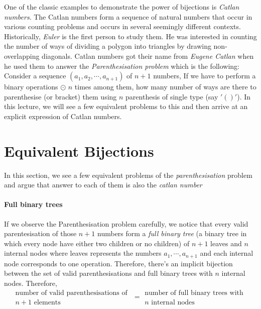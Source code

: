 
One of the classic examples to demonstrate the power of bijections is \emph{Catlan numbers}. The Catlan numbers form a sequence of natural numbers that occur in various counting problems and occurs in several seemingly different contexts. Historically, \emph{Euler} is the first person to study them. He was interested in counting the number of ways of dividing a polygon into triangles by drawing non-overlapping diagonals. Catlan numbers got their name from \emph{Eugene Catlan} when he used them to answer the \emph{Parenthesisation problem} which is the following: Consider a sequence $(a_1,a_2,\cdots,a_{n+1})$ of $n+1$ numbers, If we have to perform a binary operations $\odot$ $n$ times among them, how many number of ways are there to parenthesise (or bracket) them using $n$ parenthesis of single type (say $'()'$). In this lecture, we will see a few equivalent problems to this and then arrive at an explicit expression of Catlan numbers.
\section{Equivalent Bijections}
In this section, we see a few equivalent problems of the \emph{parenthesisation} problem and argue that answer to each of them is also the \emph{catlan number}
\paragraph{Full binary trees} If we observe the Parenthesisation problem carefully, we notice that every valid parentesisation of those $n+1$ numbers form a \emph{full binary tree} (a binary tree in which every node have either two children or no children) of $n+1$ leaves and $n$ internal nodes where leaves represents the numbers $a_1,\cdots,a_{n+1}$ and each internal node corresponds to one operation. Therefore, there's an implicit bijection between the set of valid parenthesisations and full binary trees with $n$ internal nodes. Therefore, 
\begin{equation}
    \substack{\textrm{number of valid parenthesisations of }\\ n+1 \textrm{ elements }}  = \substack{\textrm{number of full binary trees with }\\ n \textrm{ internal nodes}}
\end{equation}  

